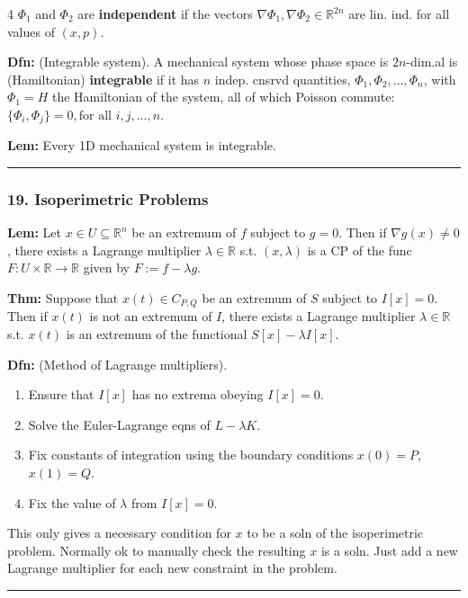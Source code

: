 \documentclass[landscape, 8pt]{extarticle}
\begin{document}
\begin{multicols*}{4}
		$\Phi_1$ and $\Phi_2$ are \textbf{independent} if the vectors $\nabla\Phi_1,\nabla\Phi_2\in\mathbb{R}^{2n}$ are lin. ind. for all values of $(x,p)$.
		
		\textbf{Dfn:} (Integrable system). A mechanical system whose phase space is $2n$-dim.al is (Hamiltonian) \textbf{integrable} if it has $n$ indep. cnsrvd quantities, $\Phi_1,\Phi_2,\ldots,\Phi_n$, with $\Phi_1=H$ the Hamiltonian of the system, all of which Poisson commute:
		$
		\{\Phi_i,\Phi_j\}=0,\text{for all }i,j,\ldots,n.
		$
		
		\textbf{Lem:} Every 1D mechanical system is integrable.
		
		\hrule
		\vspace*{-3pt}
		\subsubsection*{\tiny{19. Isoperimetric Problems}}
		\vspace*{-5pt}
		
		\textbf{Lem:} Let $x\in U\subseteq\mathbb{R}^n$ be an extremum of $f$ subject to $g=0$. Then if $\nabla g(x)\neq 0$, there exists a Lagrange multiplier $\lambda\in\mathbb{R}$ s.t. $(x,\lambda)$ is a CP of the func $F:U\times\mathbb{R}\to\mathbb{R}$ given by $F:=f-\lambda g$.
		
		\textbf{Thm:} Suppose that $x(t)\in C_{P,Q}$ be an extremum of $S$ subject to $I[x]=0$. Then if $x(t)$ is not an extremum of $I$, there exists a Lagrange multiplier $\lambda\in\mathbb{R}$ s.t. $x(t)$ is an extremum of the functional $S[x]-\lambda I[x]$.
		
		\textbf{Dfn:} (Method of Lagrange multipliers).
		\begin{enumerate}[leftmargin=*,topsep=0pt,itemsep=0pt]
			\item Ensure that $I[x]$ has no extrema obeying $I[x]=0$.
			\item Solve the Euler-Lagrange eqns of $L-\lambda K$.
			\item Fix constants of integration using the boundary conditions $x(0)=P$, $x(1)=Q$.
			\item Fix the value of $\lambda$ from $I[x]=0$.
		\end{enumerate}
		This only gives a necessary condition for $x$ to be a soln of the isoperimetric problem. Normally ok to manually check the resulting $x$ is a soln. Just add a new Lagrange multiplier for each new constraint in the problem.
		
		\hrule
		\vspace*{-3pt}

\end{multicols*}
\end{document}
